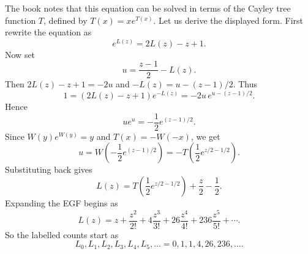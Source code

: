 The book notes that this equation can be solved in terms of the Cayley tree function $T$,
defined by $T(x) = xe^{T(x)}$. Let us derive the displayed form. First rewrite the equation as
\begin{equation*}
    e^{L(z)} = 2L(z) - z + 1.
\end{equation*}
Now set
\begin{equation*}
    u = \frac{z - 1}{2} - L(z).
\end{equation*}
Then $2L(z) - z + 1 = -2u$ and $-L(z) = u - (z - 1)/2$. Thus
\begin{equation*}
    1 = (2L(z) - z + 1)e^{-L(z)}
      = -2u\,e^{u - (z - 1)/2}.
\end{equation*}
Hence
\begin{equation*}
    u e^{u} = -\frac{1}{2}e^{(z - 1)/2}.
\end{equation*}
Since $W(y)e^{W(y)} = y$ and $T(x) = -W(-x)$, we get
\begin{equation*}
    u = W\left(-\frac{1}{2}e^{(z - 1)/2}\right)
      = -T\left(\frac{1}{2}e^{z/2 - 1/2}\right).
\end{equation*}
Substituting back gives
\begin{equation*}
    L(z) = T\left(\frac{1}{2} e^{z/2 - 1/2}\right) + \frac{z}{2} - \frac{1}{2}.
\end{equation*}
Expanding the EGF begins as
\begin{equation*}
    L(z) = z + \frac{z^{2}}{2!} + 4\frac{z^{3}}{3!}
        + 26\frac{z^{4}}{4!} + 236\frac{z^{5}}{5!} + \cdots.
\end{equation*}
So the labelled counts start as
\begin{equation*}
    L_{0}, L_{1}, L_{2}, L_{3}, L_{4}, L_{5}, \dots
    = 0, 1, 1, 4, 26, 236, \dots.
\end{equation*}


